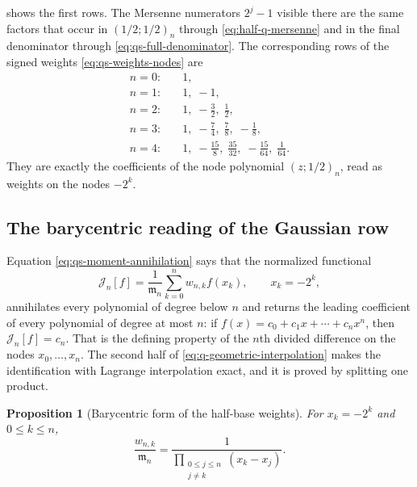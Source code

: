 \documentclass[11pt,oneside]{article}
\newtheorem{proposition}[theorem]{Proposition}
\theoremstyle{definition}
\theoremstyle{remark}
\begin{document}
 shows the first rows.  The Mersenne numerators $2^j-1$ visible
there are the same factors that occur in $(1/2;1/2)_n$ through \eqref{eq:half-q-mersenne} and
in the final denominator through \eqref{eq:qs-full-denominator}.  The corresponding rows of
the signed weights \eqref{eq:qs-weights-nodes} are
\begin{align*}
 n=0:&\quad 1,\\
 n=1:&\quad 1,\;-1,\\
 n=2:&\quad 1,\;-\tfrac32,\;\tfrac12,\\
 n=3:&\quad 1,\;-\tfrac74,\;\tfrac78,\;-\tfrac18,\\
 n=4:&\quad 1,\;-\tfrac{15}8,\;\tfrac{35}{32},\;-\tfrac{15}{64},\;\tfrac1{64}.
\end{align*}
They are exactly the coefficients of the node polynomial $(z;1/2)_n$, read as weights on the
nodes $-2^k$.

\subsection{The barycentric reading of the Gaussian row}
\label{subsec:qs-barycentric}

Equation \eqref{eq:qs-moment-annihilation} says that the normalized functional
\begin{equation}
 \mathcal J_n[f]=\frac1{\mathfrak m_n}\sum_{k=0}^{n}w_{n,k}f(x_k),
 \qquad x_k=-2^k,                                          \label{eq:qs-Kn-def}
\end{equation}
annihilates every polynomial of degree below $n$ and returns the leading coefficient of every
polynomial of degree at most $n$: if $f(x)=c_0+c_1x+\cdots+c_nx^n$, then
$\mathcal J_n[f]=c_n$.  That is the defining property of the $n$th divided difference on the
nodes $x_0,\ldots,x_n$.  The second half of \eqref{eq:q-geometric-interpolation} makes the
identification with Lagrange interpolation exact, and it is proved by splitting one product.

\begin{proposition}[Barycentric form of the half-base weights]
\label{prop:qs-barycentric}
For $x_k=-2^k$ and $0\le k\le n$,
\begin{equation}
 \frac{w_{n,k}}{\mathfrak m_n}
 =\frac1{\displaystyle\prod_{\substack{0\le j\le n\\ j\ne k}}(x_k-x_j)}. \label{eq:qs-barycentric}
\end{equation}
\end{proposition}
\end{document}
